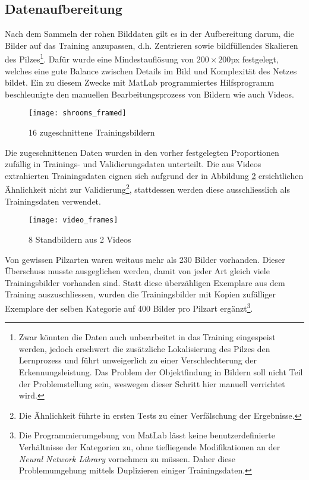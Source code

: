 \subsection{Datenaufbereitung}
Nach dem Sammeln der rohen Bilddaten gilt es in der Aufbereitung darum, die Bilder auf das Training anzupassen, d.h. Zentrieren sowie bildfüllendes Skalieren des Pilzes\footnote{Zwar könnten die Daten auch unbearbeitet in das Training eingespeist werden, jedoch erschwert die zusätzliche Lokalisierung des Pilzes den Lernprozess und führt unweigerlich zu einer Verschlechterung der Erkennungsleistung. Das Problem der Objektfindung in Bildern soll nicht Teil der Problemstellung sein, weswegen dieser Schritt hier manuell verrichtet wird.}. Dafür wurde eine Mindestauflösung von $200 \times 200$px festgelegt, welches eine gute Balance zwischen Details im Bild und Komplexität des Netzes bildet. Ein zu diesem Zwecke mit MatLab programmiertes Hilfsprogramm beschleunigte den manuellen Bearbeitungsprozess von Bildern wie auch Videos.
\begin{figure}[h]
	\centering
	\texttt{[image: shrooms\_framed]}
	\caption[\textit{\textit{Bilder zugeschnitten}}]{16 zugeschnittene Trainingsbildern}
	\label{img:shrooms_framed}
\end{figure}

Die zugeschnittenen Daten wurden in den vorher festgelegten Proportionen zufällig in Trainings- und Validierungsdaten unterteilt. Die aus Videos extrahierten Trainingsdaten eignen sich aufgrund der in Abbildung \ref{img:video_frames} ersichtlichen Ähnlichkeit nicht zur Validierung\footnote{Die Ähnlichkeit führte in ersten Tests zu einer Verfälschung der Ergebnisse.}, stattdessen werden diese ausschliesslich als Trainingsdaten verwendet.

\begin{figure}[h]
	\centering
	\texttt{[image: video\_frames]}
	\caption[\textit{\textit{Video-Frames}}]{8 Standbildern aus 2 Videos}
	\label{img:video_frames}
\end{figure}

Von gewissen Pilzarten waren weitaus mehr als 230 Bilder vorhanden. Dieser Überschuss musste ausgeglichen werden, damit von jeder Art gleich viele Trainingsbilder vorhanden sind. Statt diese überzähligen Exemplare aus dem Training auszuschliessen, wurden die Trainingsbilder mit Kopien zufälliger Exemplare der selben Kategorie auf 400 Bilder pro Pilzart ergänzt\footnote{Die Programmierumgebung von MatLab lässt keine benutzerdefinierte Verhältnisse der Kategorien zu, ohne tiefliegende Modifikationen an der \textit{Neural Network Library} vornehmen zu müssen. Daher diese Problemumgehung mittels Duplizieren einiger Trainingsdaten.}.

